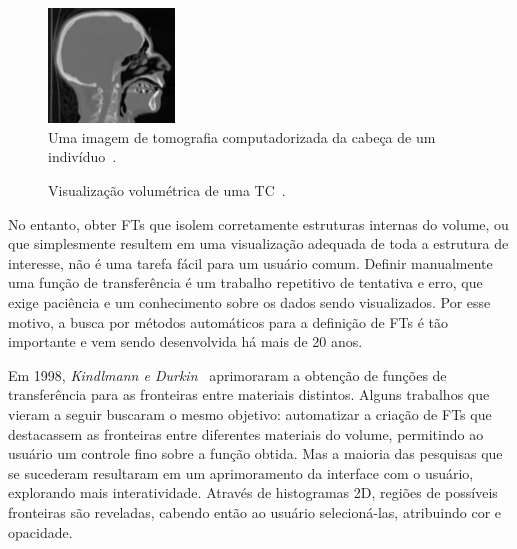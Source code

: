 \begin{figure}[h]
	\centering
	\includegraphics[width=0.3\textwidth]{images/head_ct_slice_intro}
    \caption{Uma imagem de tomografia computadorizada da cabeça de um indivíduo~\cite{gordonms}.}
    \label{fig:head_ct_slice_intro}
\end{figure}
\begin{figure}[h]
	\centering
    \caption{Visualização volumétrica de uma TC~\cite{gordonms}.}
    \label{fig:head_skull_intro}
\end{figure}
    
    No entanto, obter FTs que isolem corretamente estruturas internas do volume, ou que simplesmente resultem em uma visualização adequada de toda a estrutura de interesse, não é uma tarefa fácil para um usuário comum. Definir manualmente uma função de transferência é um trabalho repetitivo de tentativa e erro, que exige paciência e um conhecimento sobre os dados sendo visualizados. Por esse motivo, a busca por métodos automáticos para a definição de FTs é tão importante e vem sendo desenvolvida há mais de 20 anos.
    
    Em 1998, \textit{Kindlmann e Durkin}~\cite{gordon} aprimoraram a obtenção de funções de transferência para as fronteiras entre materiais distintos. Alguns trabalhos que vieram a seguir buscaram o mesmo objetivo: automatizar a criação de FTs que destacassem as fronteiras entre diferentes materiais do volume, permitindo ao usuário um controle fino sobre a função obtida. Mas a maioria das pesquisas que se sucederam resultaram em um aprimoramento da interface com o usuário, explorando mais interatividade. Através de histogramas 2D, regiões de possíveis fronteiras são reveladas, cabendo então ao usuário selecioná-las, atribuindo cor e opacidade.
    

